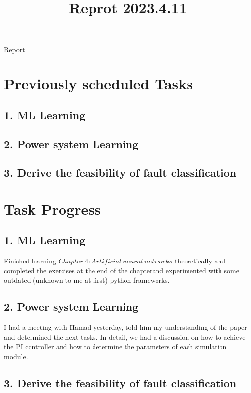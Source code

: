 \documentclass[11pt,letterpaper]{article}
\begin{document}
\univlogo

\title{Reprot 2023.4.11}

{\Huge Report}

\section*{Previously scheduled Tasks}

\subsection*{1. ML Learning}

\subsection*{2. Power system Learning}

\subsection*{3. Derive the feasibility of fault classification}

\section*{Task Progress}

\subsection*{1. ML Learning}

Finished learning $Chapter\ 4: Artificial\ neural\ networks$ theoretically and completed the exercises at the end of the chapterand experimented with some outdated (unknown to me at first) python frameworks.

\subsection*{2. Power system Learning}

I had a meeting with Hamad yesterday, told him my understanding of the paper and determined the next tasks. In detail, we had a discussion on how to achieve the PI controller and how to determine the parameters of each simulation module.

\subsection*{3. Derive the feasibility of fault classification}
\end{document}

